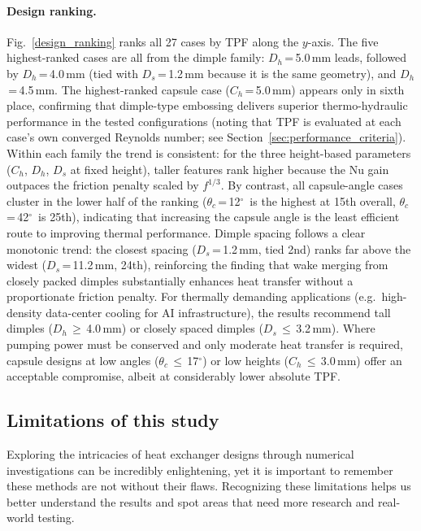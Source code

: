 \documentclass[review,12pt]{elsarticle}
\newcommand{\degree}{\ensuremath{^\circ}}
\begin{document}
\paragraph{Design ranking.}
Fig.~\ref{design_ranking} ranks all 27 cases by TPF along the $y$-axis. The five highest-ranked cases are all from the dimple family: $D_h$\,=\,5.0\,mm leads, followed by $D_h$\,=\,4.0\,mm (tied with $D_s$\,=\,1.2\,mm because it is the same geometry), and $D_h$\,=\,4.5\,mm. The highest-ranked capsule case ($C_h$\,=\,5.0\,mm) appears only in sixth place, confirming that dimple-type embossing delivers superior thermo-hydraulic performance in the tested configurations (noting that TPF is evaluated at each case's own converged Reynolds number; see Section~\ref{sec:performance_criteria}). Within each family the trend is consistent: for the three height-based parameters ($C_h$, $D_h$, $D_s$ at fixed height), taller features rank higher because the Nu gain outpaces the friction penalty scaled by $f^{1/3}$. By contrast, all capsule-angle cases cluster in the lower half of the ranking ($\theta_c$\,=\,12\degree\ is the highest at 15th overall, $\theta_c$\,=\,42\degree\ is 25th), indicating that increasing the capsule angle is the least efficient route to improving thermal performance. Dimple spacing follows a clear monotonic trend: the closest spacing ($D_s$\,=\,1.2\,mm, tied 2nd) ranks far above the widest ($D_s$\,=\,11.2\,mm, 24th), reinforcing the finding that wake merging from closely packed dimples substantially enhances heat transfer without a proportionate friction penalty. For thermally demanding applications (e.g.\ high-density data-center cooling for AI infrastructure), the results recommend tall dimples ($D_h$\,$\geq$\,4.0\,mm) or closely spaced dimples ($D_s$\,$\leq$\,3.2\,mm). Where pumping power must be conserved and only moderate heat transfer is required, capsule designs at low angles ($\theta_c$\,$\leq$\,17\degree) or low heights ($C_h$\,$\leq$\,3.0\,mm) offer an acceptable compromise, albeit at considerably lower absolute TPF.

\subsection{Limitations of this study}
\label{sec:limitations}

Exploring the intricacies of heat exchanger designs through numerical investigations can be incredibly enlightening, yet it is important to remember these methods are not without their flaws. Recognizing these limitations helps us better understand the results and spot areas that need more research and real-world testing.
\end{document}
